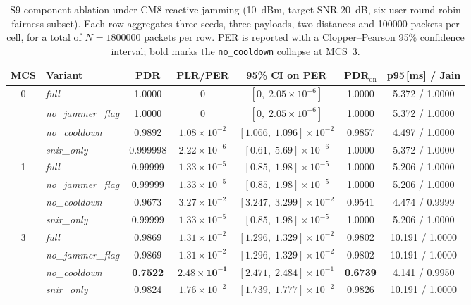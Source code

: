 \documentclass[journal,onecolumn,11pt,a4paper]{IEEEtran}
\begin{document}
\begin{table}[t]
  \centering
  \caption{S9 component ablation under CM8 reactive jamming
  (\SI{10}{dBm}, target SNR \SI{20}{dB}, six-user round-robin
  fairness subset). Each row aggregates three seeds, three
  payloads, two distances and \num{100000} packets per cell, for
  a total of $N = \num{1800000}$ packets per row. PER is reported
  with a Clopper--Pearson 95\% confidence interval; bold marks
  the \texttt{no\_cooldown} collapse at MCS~3.}
  \label{tab:tab11}
  \footnotesize
  \begin{tabular}{c l c c c c c}
    \toprule
    MCS & Variant & PDR & PLR/PER & 95\% CI on PER & PDR$_{\mathrm{on}}$ & p95\,[ms] / Jain \\
    \midrule
    \multirow{4}{*}{0}
      & \emph{full}              & 1.0000    & $0$                  & $[0,\;2.05\times 10^{-6}]$           & 1.0000 & 5.372 / 1.0000 \\
      & \emph{no\_jammer\_flag}   & 1.0000    & $0$                  & $[0,\;2.05\times 10^{-6}]$           & 1.0000 & 5.372 / 1.0000 \\
      & \emph{no\_cooldown}      & 0.9892    & $1.08\times 10^{-2}$  & $[1.066,\;1.096]\times 10^{-2}$  & 0.9857 & 4.497 / 1.0000 \\
      & \emph{snir\_only}        & 0.999998  & $2.22\times 10^{-6}$  & $[0.61,\;5.69]\times 10^{-6}$        & 1.0000 & 5.372 / 1.0000 \\
    \midrule
    \multirow{4}{*}{1}
      & \emph{full}              & 0.99999   & $1.33\times 10^{-5}$  & $[0.85,\;1.98]\times 10^{-5}$        & 1.0000 & 5.206 / 1.0000 \\
      & \emph{no\_jammer\_flag}   & 0.99999   & $1.33\times 10^{-5}$  & $[0.85,\;1.98]\times 10^{-5}$        & 1.0000 & 5.206 / 1.0000 \\
      & \emph{no\_cooldown}      & 0.9673    & $3.27\times 10^{-2}$  & $[3.247,\;3.299]\times 10^{-2}$  & 0.9541 & 4.474 / 0.9999 \\
      & \emph{snir\_only}        & 0.99999   & $1.33\times 10^{-5}$  & $[0.85,\;1.98]\times 10^{-5}$        & 1.0000 & 5.206 / 1.0000 \\
    \midrule
    \multirow{4}{*}{3}
      & \emph{full}              & 0.9869    & $1.31\times 10^{-2}$  & $[1.296,\;1.329]\times 10^{-2}$  & 0.9802 & 10.191 / 1.0000 \\
      & \emph{no\_jammer\_flag}   & 0.9869    & $1.31\times 10^{-2}$  & $[1.296,\;1.329]\times 10^{-2}$  & 0.9802 & 10.191 / 1.0000 \\
      & \emph{no\_cooldown}      & \textbf{0.7522} & $\mathbf{2.48\times 10^{-1}}$ & $[2.471,\;2.484]\times 10^{-1}$  & \textbf{0.6739} & 4.141 / 0.9950 \\
      & \emph{snir\_only}        & 0.9824    & $1.76\times 10^{-2}$  & $[1.739,\;1.777]\times 10^{-2}$  & 0.9826 & 10.191 / 1.0000 \\
    \bottomrule
  \end{tabular}
\end{table}
\end{document}
